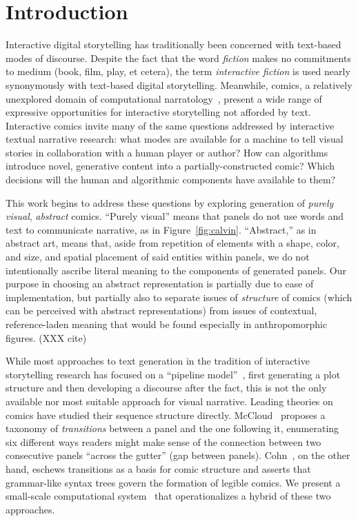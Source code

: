 \section{Introduction}

Interactive digital storytelling has traditionally been concerned with
text-based modes of discourse. Despite the fact that the word {\em fiction}
makes no commitments to medium (book, film, play, et cetera), the term {\em
interactive fiction} is used nearly synonymously with text-based digital
storytelling. Meanwhile, comics, a relatively unexplored domain of
computational narratology~\cite{mani2012computational}, present a wide
range of expressive opportunities for interactive storytelling not afforded
by text.  Interactive comics invite many of the same questions addressed by
interactive textual narrative research: what modes are available for a
machine to tell visual stories in collaboration with a human player or
author? How can algorithms introduce novel, generative content into a
partially-constructed comic?  Which decisions will the human and
algorithmic components have available to them?

This work begins to address these questions by exploring generation of {\em
purely visual}, {\em abstract} comics. ``Purely visual'' means that panels
do not use words and text to communicate narrative, as in
Figure~\ref{fig:calvin}. ``Abstract,'' as in abstract art, means that,
aside from repetition of elements with a shape, color, and size, and
spatial placement of said entities within panels, we do not intentionally
ascribe literal meaning to the components of generated panels. Our purpose
in choosing an abstract representation is partially due to ease of
implementation, but partially also to separate issues of {\em structure} of
comics (which can be perceived with abstract representations) from issues
of contextual, reference-laden meaning that would be found especially in
anthropomorphic figures. (XXX cite)

While most approaches to text generation in the tradition of interactive
storytelling research has focused on a ``pipeline
model''~\cite{ronfard2014story}, first generating a plot structure and then
developing a discourse after the fact, this is not the only
available nor most suitable approach for visual narrative. 
Leading theories on comics have studied their sequence structure directly.
McCloud~\cite{mcCloud1993understanding} proposes a taxonomy of {\em
transitions} between a panel and the one following it, enumerating six
different ways readers might make sense of the connection between two
consecutive panels ``across the gutter'' (gap between panels).
Cohn~\cite{cohn2013visual}, on the other hand, eschews transitions as a
basis for comic structure and asserts that grammar-like syntax trees govern
the formation of legible comics.
We present a small-scale computational
system~\cite{montfort2012small} that operationalizes a hybrid of these two
approaches.


